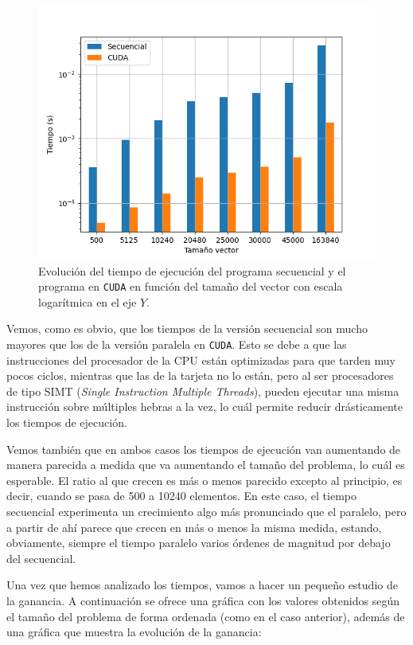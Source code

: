 \documentclass[11pt,a4paper]{article}
\begin{document}
\begin{figure}[H]
  \centering
  \includegraphics[scale=0.6]{img/seq-cuda}
  \caption{Evolución del tiempo de ejecución del programa secuencial y el programa en
  \texttt{CUDA} en función del tamaño del vector con escala logarítmica en el eje $Y$.}
  \label{fig:seq-cuda}
\end{figure}

Vemos, como es obvio, que los tiempos de la versión secuencial son mucho mayores que los
de la versión paralela en \texttt{CUDA}. Esto se debe a que las instrucciones del procesador
de la CPU están optimizadas para que tarden muy pocos ciclos, mientras que las de la
tarjeta no lo están, pero al ser procesadores de tipo SIMT
(\textit{Single Instruction Multiple Threads}), pueden ejecutar una misma
instrucción sobre múltiples hebras a la vez, lo cuál permite reducir drásticamente los tiempos
de ejecución.

Vemos también que en ambos casos los tiempos de ejecución van aumentando de manera parecida
a medida que va aumentando el tamaño del problema, lo cuál es esperable. El ratio al que crecen
es más o menos parecido excepto al principio, es decir, cuando se pasa de 500 a 10240 elementos.
En este caso, el tiempo secuencial experimenta un crecimiento algo más pronunciado que el
paralelo, pero a partir de ahí parece que crecen en más o menos la misma medida, estando,
obviamente, siempre el tiempo paralelo varios órdenes de magnitud por debajo del secuencial.

Una vez que hemos analizado los tiempos, vamos a hacer un pequeño estudio de la ganancia.
A continuación se ofrece una gráfica con los valores obtenidos según el tamaño del problema
de forma ordenada (como en el caso anterior), además de una gráfica que muestra la evolución
de la ganancia:
\end{document}
